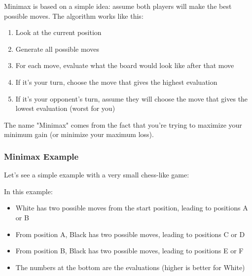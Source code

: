 \documentclass[11pt]{article}
\begin{document}
Minimax is based on a simple idea: assume both players will make the best possible moves. The algorithm works like this:

\begin{enumerate}
    \item Look at the current position
    \item Generate all possible moves
    \item For each move, evaluate what the board would look like after that move
    \item If it's your turn, choose the move that gives the highest evaluation
    \item If it's your opponent's turn, assume they will choose the move that gives the lowest evaluation (worst for you)
\end{enumerate}

The name "Minimax" comes from the fact that you're trying to maximize your minimum gain (or minimize your maximum loss).

\subsubsection{Minimax Example}

Let's see a simple example with a very small chess-like game:

\begin{center}
\end{center}

In this example:
\begin{itemize}
    \item White has two possible moves from the start position, leading to positions A or B
    \item From position A, Black has two possible moves, leading to positions C or D
    \item From position B, Black has two possible moves, leading to positions E or F
    \item The numbers at the bottom are the evaluations (higher is better for White)
\end{itemize}
\end{document}
